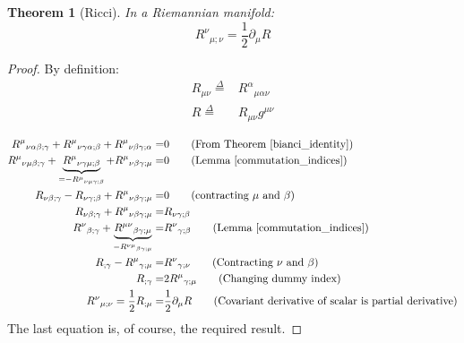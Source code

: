 \documentclass[10pt,a4paper]{article}
\newtheorem{theorem}{Theorem}
\begin{document}
		\begin{theorem}[Ricci]\label{ricci}
			In a Riemannian  manifold:
				\begin{equation}
			{R^\nu}_{\mu;\nu}=\frac{1}{2}\partial_{\mu}R \label{ricci}
			\end{equation}
		\end{theorem}
		\begin{proof}
				By definition:
			\begin{align}
			R_{\mu\nu}\overset{\Delta}{=}&{R^\alpha}_{\mu\alpha\nu}\\
			R\overset{\Delta}{=}&R_{\mu\nu}g^{\mu\nu}
			\end{align}
			
			\begin{align*}
			{R^\mu}_{\nu\alpha\beta;\gamma} +	{R^\mu}_{\nu\gamma\alpha;\beta} +	{R^\mu}_{\nu\beta\gamma;\alpha} =& 0  \tag{From Theorem \ref{bianci_identity}} \\
			{R^\mu}_{\nu\mu\beta;\gamma} +	\underbrace{{R^\mu}_{\nu\gamma\mu;\beta}}_{={-R^\mu}_{\nu\mu\gamma;\beta}} +	{R^\mu}_{\nu\beta\gamma;\mu} =& 0  \tag{Lemma \ref{commutation_indices}}\\
			R_{\nu\beta;\gamma} -	R_{\nu\gamma;\beta} +	{R^\mu}_{\nu\beta\gamma;\mu} =& 0 \tag{contracting $\mu$ and $\beta$} \\
			R_{\nu\beta;\gamma}  +	{R^\mu}_{\nu\beta\gamma;\mu} =& 	R_{\nu\gamma;\beta}\\
			{R^\nu}_{\beta;\gamma}  +	\underbrace{{R^{\mu\nu}}_{\beta\gamma;\mu}}_{-{R^{\nu\mu}}_{\beta\gamma;\mu}} =& {R^\nu}_{\gamma;\beta}	\tag{Lemma \ref{commutation_indices}}\\
			R_{;\gamma} - {R^\mu}_{\gamma;\mu} =& {R^\nu}_{\gamma;\nu} \tag{Contracting $\nu$ and $\beta$} \\
			R_{;\gamma}  =& 2{R^\mu}_{\gamma;\mu} \tag{Changing dummy index} \\
			{R^\nu}_{\mu;\nu} = \frac{1}{2} R_{;\mu} =&  \frac{1}{2} \partial_{\mu} R \tag{Covariant derivative of scalar is partial derivative}
			\end{align*}
			The last equation is, of course, the required result.
		\end{proof}
\end{document}
